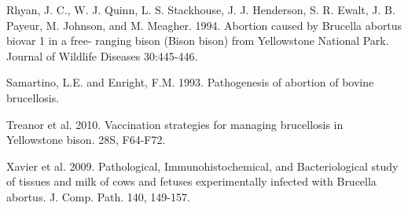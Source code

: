 \documentclass[letterpaper,12pt]{article}
\begin{document}
Rhyan, J. C., W. J. Quinn, L. S. Stackhouse, J. J. Henderson, S. R. Ewalt, J. B. Payeur, M. Johnson, and M. Meagher. 1994. Abortion caused by Brucella abortus biovar 1 in a free- ranging bison (Bison bison) from Yellowstone National Park. Journal of Wildlife Diseases 30:445-446.

Samartino, L.E. and Enright, F.M. 1993. Pathogenesis of abortion of bovine brucellosis. 

Treanor et al. 2010. Vaccination strategies for managing brucellosis in Yellowstone bison. 28S, F64-F72.

Xavier et al. 2009. Pathological, Immunohistochemical, and Bacteriological study of tissues and milk of cows and fetuses experimentally infected with Brucella abortus. J. Comp. Path. 140, 149-157. 
\end{document}
